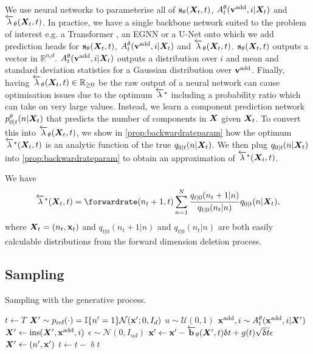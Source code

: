We use neural networks to parameterise all of ${\mathbf{s}}_\theta({\bm{X}}_t, t)$, $A_t^\theta({\mathbf{v}}^{\textup{add}}, i | {\bm{X}}_t)$ and $\overleftarrow{\lambda}_\theta({\bm{X}}_t, t)$. In practice, we have a single backbone network suited to the problem of interest e.g. a Transformer \cite{vaswani2017attention}, an EGNN \cite{satorras2021n} or a U-Net \cite{ronneberger2015u} onto which we add prediction heads for ${\mathbf{s}}_\theta({\bm{X}}_t, t)$, $A_t^\theta({\mathbf{v}}^{\textup{add}}, i | {\bm{X}}_t)$ and $\overleftarrow{\lambda}_\theta({\bm{X}}_t, t)$. ${\mathbf{s}}_\theta({\bm{X}}_t, t)$ outputs a vector in $\mathbb{R}^{n_t d}$. $A_t^\theta({\mathbf{v}}^{\textup{add}}, i | {\bm{X}}_t)$ outputs a distribution over $i$ and mean and standard deviation statistics for a Gaussian distribution over ${\mathbf{v}}^{\textup{add}}$. Finally, having $\overleftarrow{\lambda}_\theta({\bm{X}}_t, t) \in \mathbb{R}_{\geq 0}$ be the raw output of a neural network can cause optimisation issues due to the optimum $\overleftarrow{\lambda}^*$ including a probability ratio which can take on very large values. Instead, we learn a component prediction network $p^\theta_{0|t}(n | {\bm{X}}_t)$ that predicts the number of components in ${\bm{X}}$ given ${\bm{X}}_t$. To convert this into $\overleftarrow{\lambda}_\theta({\bm{X}}_t, t)$, we show in \cref{prop:backwardrateparam} how the optimum $\overleftarrow{\lambda}^*({\bm{X}}_t, t)$ is an analytic function of the true $q_{0|t}(n | {\bm{X}}_t)$. We then plug $q_{0|t}(n | {\bm{X}}_t)$ into \cref{prop:backwardrateparam} to obtain an approximation of $\overleftarrow{\lambda}^*({\bm{X}}_t, t)$.
\begin{proposition} We have
    \label{prop:backwardrateparam}
    \begin{equation}\label{eq:backwardrateparam}
        \backwardrate^*(\mX_t, t) = \forwardrate(n_t+1, t) \sum_{n=1}^N \frac{q_{t|0}(n_t + 1 | n)}{q_{t|0}(n_t | n)} q_{0|t}(n | \mX_t),
    \end{equation}
    where ${\bm{X}}_t = (n_t, {\mathbf{x}}_t)$ and $q_{t|0}(n_t + 1 | n)$ and $q_{t|0}(n_t | n)$ are both easily calculable distributions from the forward dimension deletion process.
\end{proposition}



\subsection{Sampling}

\begin{algorithm}[t]
\caption{Sampling with the generative process.}
\begin{algorithmic}[1] %
\State $t \leftarrow T$
\State ${\bm{X}}' \sim p_{\textup{ref}}(\cdot) = \mathbb{I}\{ n'=1\} \mathcal{N}({\mathbf{x}}'; 0, I_{d})$
    \State $u \sim \mathcal{U}(0, 1)$
        \State ${\mathbf{x}}^{\textup{add}}, i \sim A_{t}^\theta({\mathbf{x}}^{\textup{add}}, i | {\bm{X}}')$
        \State ${\bm{X}}' \leftarrow \text{ins}({\bm{X}}', {\mathbf{x}}^{\textup{add}}, i)$
    \EndIf
    \State $\epsilon \sim \mathcal{N}(0, I_{nd})$
    \State ${\mathbf{x}}' \leftarrow {\mathbf{x}}' - \overleftarrow{\mathbf{b}}_\theta({\bm{X}}', t) \updelta t + g(t) \sqrt{\updelta t} \epsilon$
    \State ${\bm{X}}' \leftarrow (n', {\mathbf{x}}')$
    \State $t \leftarrow t - \updelta t$
\EndWhile
\end{algorithmic}
\label{alg:backwardsampling}
\end{algorithm}

